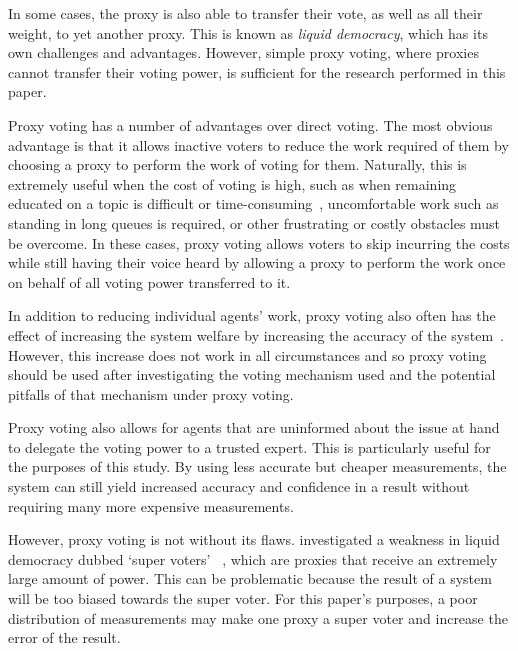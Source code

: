 In some cases, the proxy is also able to transfer their vote, as well as all
their weight, to yet another proxy.
This is known as \textit{liquid democracy}, which has its own challenges and
advantages.
However, simple proxy voting, where proxies cannot transfer their voting power,
is sufficient for the research performed in this paper.

Proxy voting has a number of advantages over direct voting.
The most obvious advantage is that it allows inactive voters to reduce the work
required of them by choosing a proxy to perform the work of voting for them.
Naturally, this is extremely useful when the cost of voting is high, such as
when remaining educated on a topic is difficult or
time-consuming~\cite[para.~1.1]{Mueller1972}, uncomfortable work such as
standing in long queues is required, or other frustrating or costly obstacles
must be overcome.
In these cases, proxy voting allows voters to skip incurring the costs while
still having their voice heard by allowing a proxy to perform the work once on
behalf of all voting power transferred to it.

In addition to reducing individual agents' work, proxy voting also often has
the effect of increasing the system welfare by increasing the accuracy of the
system~\cite[sec.~1.1]{Cohensius2017}.
However, this increase does not work in all circumstances and so proxy voting
should be used after investigating the voting mechanism used and the potential
pitfalls of that mechanism under proxy voting.

Proxy voting also allows for agents that are uninformed about the issue at hand to
delegate the voting power to a trusted expert.
This is particularly useful for the purposes of this study.
By using less accurate but cheaper measurements, the system can still yield
increased accuracy and confidence in a result without requiring many more
expensive measurements.

However, proxy voting is not without its flaws.
 investigated a weakness in liquid democracy dubbed `super voters'
~\cite[para.~1.3]{Golz2021}, which are proxies that receive an extremely large
amount of power.
This can be problematic because the result of a system will be too biased
towards the super voter.
For this paper's purposes, a poor distribution of measurements may make one
proxy a super voter and increase the error of the result.



